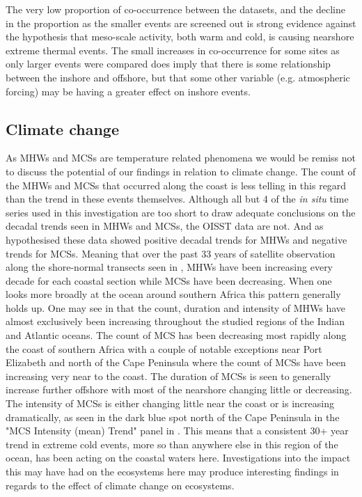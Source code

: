 \documentclass[a4paper,10pt,review]{elsarticle}
\begin{document}
The very low proportion of co-occurrence between the datasets, and the decline in the proportion as the smaller events are screened out is strong evidence against the hypothesis that meso-scale activity, both warm and cold, is causing nearshore extreme thermal events. The small increases in co-occurrence for some sites as only larger events were compared does imply that there is some relationship between the inshore and offshore, but that some other variable (e.g. atmospheric forcing) may be having a greater effect on inshore events.

\subsection{Climate change}
As MHWs and MCSs are temperature related phenomena we would be remiss not to discuss the potential of our findings in relation to climate change. The count of the MHWs and MCSs that occurred along the coast is less telling in this regard than the trend in these events themselves. Although all but 4 of the \emph{in situ} time series used in this investigation are too short to draw adequate conclusions on the decadal trends seen in MHWs and MCSs, the OISST data are not. And as hypothesised these data showed positive decadal trends for MHWs and negative trends for MCSs. Meaning that over the past 33 years of satellite observation along the shore-normal transects seen in , MHWs have been increasing every decade for each coastal section while MCSs have been decreasing. When one looks more broadly at the ocean around southern Africa this pattern generally holds up. One may see in  that the count, duration and intensity of MHWs have almost exclusively been increasing throughout the studied regions of the Indian and Atlantic oceans. The count of MCS has been decreasing most rapidly along the coast of southern Africa with a couple of notable exceptions near Port Elizabeth and north of the Cape Peninsula where the count of MCSs have been increasing very near to the coast. The duration of MCSs is seen to generally increase further offshore with most of the nearshore changing little or decreasing. The intensity of MCSs is either changing little near the coast or is increasing dramatically, as seen in the dark blue spot north of the Cape Peninsula in the "MCS Intensity (mean) Trend" panel in . This means that a consistent 30+ year trend in extreme cold events, more so than anywhere else in this region of the ocean, has been acting on the coastal waters here. Investigations into the impact this may have had on the ecosystems here may produce interesting findings in regards to the effect of climate change on ecosystems.
\end{document}
